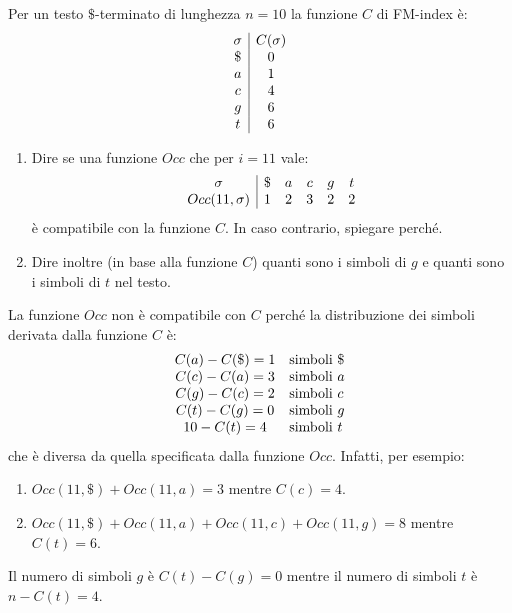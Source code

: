 \begin{esempio}
    Per un testo $\$$-terminato di lunghezza $n = 10$ la funzione $C$ di FM-index è:
    \begin{equation}
        \begin{array}{c | c}
            \sigma & C(\sigma) \\
            \$     & 0         \\
            a      & 1         \\
            c      & 4         \\
            g      & 6         \\
            t      & 6         \\
        \end{array}
    \end{equation}
    \begin{enumerate}
        \item Dire se una funzione $Occ$ che per $i = 11$ vale:
              \begin{equation}
                  \begin{array}{c | c c c c c}
                      \sigma          & \$ & a & c & g & t \\
                      Occ(11, \sigma) & 1  & 2 & 3 & 2 & 2 \\
                  \end{array}
              \end{equation}
              è compatibile con la funzione $C$. In caso contrario, spiegare
              perché.
        \item Dire inoltre (in base alla funzione $C$) quanti sono i simboli
              di $g$ e quanti sono i simboli di $t$ nel testo.
    \end{enumerate}

    La funzione $Occ$ non è compatibile con $C$ perché la distribuzione dei simboli
    derivata dalla funzione $C$ è:
    \begin{equation}
        \begin{array}{c l}
            C(a) - C(\$) = 1 & \text{simboli } \$ \\
            C(c) - C(a) = 3  & \text{simboli } a  \\
            C(g) - C(c) = 2  & \text{simboli } c  \\
            C(t) - C(g) = 0  & \text{simboli } g  \\
            10 - C(t) = 4    & \text{simboli } t  \\
        \end{array}
    \end{equation}
    che è diversa da quella specificata dalla funzione $Occ$. Infatti, per esempio:
    \begin{enumerate}
        \item $Occ(11, \$) + Occ(11, a) = 3$ mentre $C(c) = 4$.
        \item $Occ(11, \$) + Occ(11, a) + Occ(11, c) + Occ(11, g) = 8$ mentre
              $C(t) = 6$.
    \end{enumerate}
    Il numero di simboli $g$ è $C(t) - C(g) = 0$ mentre il numero di simboli $t$
    è $n - C(t) = 4$.
\end{esempio}
